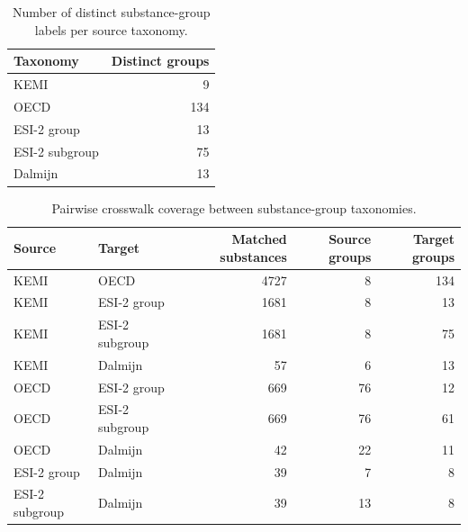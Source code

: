 \begin{table}[htbp]
\centering
\caption{Number of distinct substance-group labels per source taxonomy.}
\label{tab:pfas-taxonomy-structure}
\begin{tabular}{lr}
\toprule
Taxonomy & Distinct groups \\
\midrule
KEMI & 9 \\
OECD & 134 \\
ESI-2 group & 13 \\
ESI-2 subgroup & 75 \\
Dalmijn & 13 \\
\bottomrule
\end{tabular}
\end{table}

\begin{table}[htbp]
\centering
\caption{Pairwise crosswalk coverage between substance-group taxonomies.}
\label{tab:pfas-crosswalk-coverage}
\begin{tabular}{llrrr}
\toprule
Source & Target & Matched substances & Source groups & Target groups \\
\midrule
KEMI & OECD & 4727 & 8 & 134 \\
KEMI & ESI-2 group & 1681 & 8 & 13 \\
KEMI & ESI-2 subgroup & 1681 & 8 & 75 \\
KEMI & Dalmijn & 57 & 6 & 13 \\
OECD & ESI-2 group & 669 & 76 & 12 \\
OECD & ESI-2 subgroup & 669 & 76 & 61 \\
OECD & Dalmijn & 42 & 22 & 11 \\
ESI-2 group & Dalmijn & 39 & 7 & 8 \\
ESI-2 subgroup & Dalmijn & 39 & 13 & 8 \\
\bottomrule
\end{tabular}
\end{table}
